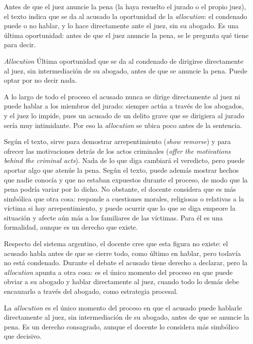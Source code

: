 \documentclass[12pt,oneside]{book}
\begin{document}
Antes de que el juez anuncie la pena (la haya resuelto el jurado o el propio juez), el texto indica que se da al acusado la oportunidad de la \textit{allocution}: el condenado puede o no hablar, y lo hace directamente ante el juez, sin su abogado. Es una última oportunidad: antes de que el juez anuncie la pena, se le pregunta qué tiene para decir.

\begin{definition}{\textit{Allocution}}
Última oportunidad que se da al condenado de dirigirse directamente al juez, sin intermediación de su abogado, antes de que se anuncie la pena. Puede optar por no decir nada.
\end{definition}

A lo largo de todo el proceso el acusado nunca se dirige directamente al juez ni puede hablar a los miembros del jurado: siempre actúa a través de los abogados, y el juez lo impide, pues un acusado de un delito grave que se dirigiera al jurado sería muy intimidante. Por eso la \textit{allocution} se ubica poco antes de la sentencia.

Según el texto, sirve para demostrar arrepentimiento (\textit{show remorse}) y para ofrecer las motivaciones detrás de los actos criminales (\textit{offer the motivations behind the criminal acts}). Nada de lo que diga cambiará el veredicto, pero puede aportar algo que atenúe la pena. Según el texto, puede además mostrar hechos que nadie conocía y que no estaban expuestos durante el proceso, de modo que la pena podría variar por lo dicho. No obstante, el docente considera que es más simbólica que otra cosa: responde a cuestiones morales, religiosas o relativas a la víctima si hay arrepentimiento, y puede ocurrir que lo que se diga empeore la situación y afecte aún más a los familiares de las víctimas. Para él es una formalidad, aunque es un derecho que existe.

Respecto del sistema argentino, el docente cree que esta figura no existe: el acusado habla antes de que se cierre todo, como último en hablar, pero todavía no está condenado. Durante el debate el acusado tiene derecho a declarar, pero la \textit{allocution} apunta a otra cosa: es el único momento del proceso en que puede obviar a su abogado y hablar directamente al juez, cuando todo lo demás debe encauzarlo a través del abogado, como estrategia procesal.

\begin{important}
La \textit{allocution} es el único momento del proceso en que el acusado puede hablarle directamente al juez, sin intermediación de su abogado, antes de que se anuncie la pena. Es un derecho consagrado, aunque el docente lo considera más simbólico que decisivo.
\end{important}
\end{document}
